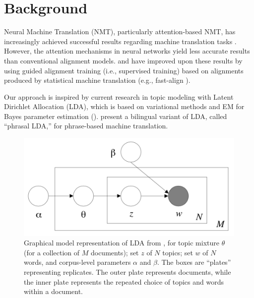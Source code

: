 \documentclass[twoside,twocolumn]{article}
\begin{document}

\section{Background}

Neural Machine Translation (NMT), particularly attention-based NMT, has
increasingly achieved successful results regarding machine translation tasks
\cite{bahdanau2014neural}. However, the attention mechanisms in neural networks
yield less accurate results than conventional alignment models.
\cite{liu2016neural} and \cite{chen2016guided} have improved upon these results
by using guided alignment training (i.e., supervised training) based on
alignments produced by statistical machine translation
(e.g., fast-align \cite{dyer2013simple}).


Our approach is inspired by current research in topic modeling with Latent
Dirichlet Allocation (LDA), which is based on variational methods
and EM for Bayes parameter estimation (\cite{blei2003latent}).
\cite{hasler2014dynamic} present a bilingual variant of LDA, called
``phrasal LDA,'' for phrase-based machine translation.

\begin{figure}
\centering
\includegraphics[scale=0.5]{LDADiagram}
\caption{Graphical model representation of LDA from \cite{blei2003latent}, for
topic mixture $\theta$ (for a collection of $M$ documents); set $z$ of $N$
topics; set $w$ of $N$ words, and corpus-level parameters $\alpha$ and $\beta$.
The boxes are ``plates'' representing replicates. The outer plate represents
documents, while the inner plate represents the repeated choice of topics and
words within a document.}
\end{figure}
\end{document}
